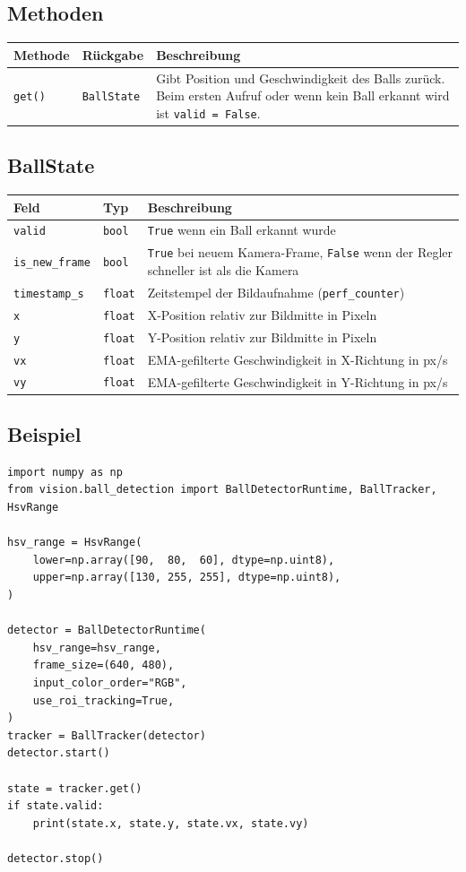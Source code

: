 \documentclass[11pt, a4paper]{scrreprt}
\begin{document}
\subsection*{Methoden}

\begin{tabularx}{\textwidth}{l l X}
  \toprule
  Methode & Rückgabe & Beschreibung \\
  \midrule
  \texttt{get()} & \texttt{BallState} & Gibt Position und Geschwindigkeit des Balls zurück. Beim ersten Aufruf oder wenn kein Ball erkannt wird ist \texttt{valid = False}. \\
  \bottomrule
\end{tabularx}

\subsection*{BallState}

\begin{tabularx}{\textwidth}{l l X}
  \toprule
  Feld & Typ & Beschreibung \\
  \midrule
  \texttt{valid} & \texttt{bool} & \texttt{True} wenn ein Ball erkannt wurde \\
  \texttt{is\_new\_frame} & \texttt{bool} & \texttt{True} bei neuem Kamera-Frame, \texttt{False} wenn der Regler schneller ist als die Kamera \\
  \texttt{timestamp\_s} & \texttt{float} & Zeitstempel der Bildaufnahme (\texttt{perf\_counter}) \\
  \texttt{x} & \texttt{float} & X-Position relativ zur Bildmitte in Pixeln \\
  \texttt{y} & \texttt{float} & Y-Position relativ zur Bildmitte in Pixeln \\
  \texttt{vx} & \texttt{float} & EMA-gefilterte Geschwindigkeit in X-Richtung in px/s \\
  \texttt{vy} & \texttt{float} & EMA-gefilterte Geschwindigkeit in Y-Richtung in px/s \\
  \bottomrule
\end{tabularx}

\subsection*{Beispiel}

\begin{lstlisting}
import numpy as np
from vision.ball_detection import BallDetectorRuntime, BallTracker, HsvRange

hsv_range = HsvRange(
    lower=np.array([90,  80,  60], dtype=np.uint8),
    upper=np.array([130, 255, 255], dtype=np.uint8),
)

detector = BallDetectorRuntime(
    hsv_range=hsv_range,
    frame_size=(640, 480),
    input_color_order="RGB",
    use_roi_tracking=True,
)
tracker = BallTracker(detector)
detector.start()

state = tracker.get()
if state.valid:
    print(state.x, state.y, state.vx, state.vy)

detector.stop()
\end{lstlisting}
\end{document}
